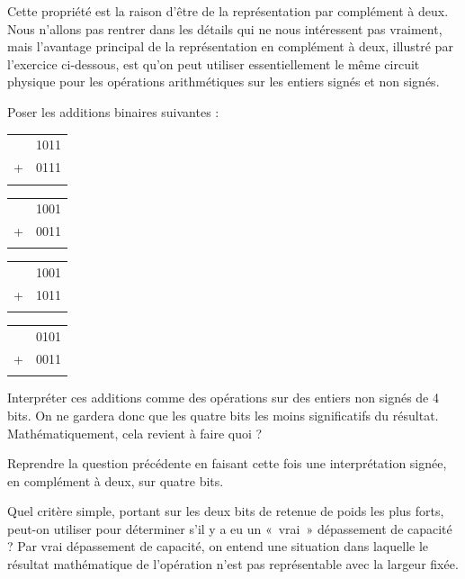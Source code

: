 \documentclass{magnolia}
\begin{document}
\begin{remarques}
  \remarque
  Cette propriété est la raison d'être de la représentation par complément
  à deux.
  \remarque
  Nous n'allons pas rentrer dans les détails qui ne nous intéressent pas
  vraiment, mais l'avantage principal de la représentation en complément à
  deux, illustré par l'exercice ci-dessous, est qu'on peut utiliser
  essentiellement le même circuit physique pour les opérations arithmétiques
  sur les entiers signés et non signés.
\end{remarques}
\vspace{2ex}
\begin{exoUnique}
  \exo
  \begin{questions}
    \item Poser les additions binaires suivantes :
          \begin{multicols}{4}
            \begin{tabular}{rl}
              & 1011 \\
              + & 0111 \\
              \hline
              &
            \end{tabular}
            \begin{tabular}{rl}
              & 1001 \\
              + & 0011 \\
              \hline
              &
            \end{tabular}
            \begin{tabular}{rl}
              & 1001 \\
              + & 1011 \\
              \hline
              &
            \end{tabular}
            \begin{tabular}{rl}
              & 0101 \\
              + & 0011 \\
              \hline
              &
            \end{tabular}
          \end{multicols}
    \item Interpréter ces additions comme des opérations sur des
          entiers non signés de 4 bits. On ne gardera donc que les
          quatre bits les moins significatifs du résultat.
          Mathématiquement, cela revient à faire quoi ?
    \item Reprendre la question précédente en faisant cette fois
          une interprétation signée, en complément à deux, sur
          quatre bits.
    \item Quel critère simple, portant sur les deux bits de retenue
          de poids les plus forts, peut-on utiliser pour déterminer
          s'il y a eu un «~vrai~» dépassement de capacité ?
          Par \og vrai \fg dépassement de capacité, on entend une
          situation dans laquelle le résultat mathématique de
          l'opération n'est pas représentable avec la largeur fixée.
  \end{questions}
\end{exoUnique}
\vspace{2ex}
\end{document}
